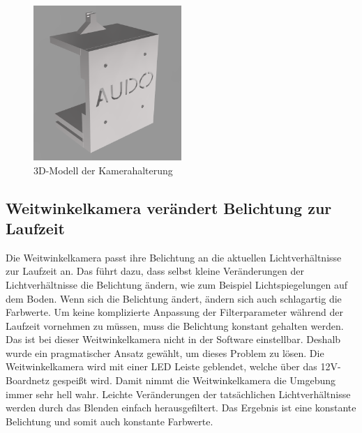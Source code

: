 \begin{figure}[H]
		\centering
		\includegraphics[width=0.5\textwidth]{images/CAD_Halterung.png}
	\caption{3D-Modell der Kamerahalterung}
	\label{fig:halterung}
\end{figure}


\subsection{Weitwinkelkamera verändert Belichtung zur Laufzeit}
\label{sec:belichtung}
Die Weitwinkelkamera passt ihre Belichtung an die aktuellen Lichtverhältnisse zur Laufzeit an.
Das führt dazu, dass selbst kleine Veränderungen der Lichtverhältnisse die Belichtung ändern, wie zum Beispiel Lichtspiegelungen auf dem Boden.
Wenn sich die Belichtung ändert, ändern sich auch schlagartig die Farbwerte.
Um keine komplizierte Anpassung der Filterparameter während der Laufzeit vornehmen zu müssen, muss die Belichtung konstant gehalten werden.
Das ist bei dieser Weitwinkelkamera nicht in der Software einstellbar.
Deshalb wurde ein pragmatischer Ansatz gewählt, um dieses Problem zu lösen.
Die Weitwinkelkamera wird mit einer LED Leiste geblendet, welche über das 12V-Boardnetz gespeißt wird.
Damit nimmt die Weitwinkelkamera die Umgebung immer sehr hell wahr.
Leichte Veränderungen der tatsächlichen Lichtverhältnisse werden durch das Blenden einfach herausgefiltert. 
Das Ergebnis ist eine konstante Belichtung und somit auch konstante Farbwerte.

